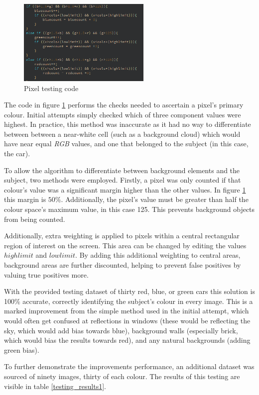 \documentclass[conference]{IEEEtran}
\begin{document}
\begin{figure}[H]
\centering
\includegraphics[width=2.5in]{t1}
\caption{Pixel testing code}
\label{fig_t1code}
\end{figure}

The code in figure \ref{fig_t1code} performs the checks needed to ascertain a pixel's primary colour. Initial attempts simply checked which of three component values were highest. In practice, this method was inaccurate as it had no way to differentiate between  between a near-white cell (such as a background cloud) which would have near equal \textit{RGB} values, and one that belonged to the subject (in this case, the car).

To allow the algorithm to differentiate between background elements and the subject, two methods were employed. Firstly, a pixel was only counted if that colour's value was a significant margin higher than the other values. In figure \ref{fig_t1code} this margin is $50\%$. Additionally, the pixel's value must be greater than half the colour space's maximum value, in this case 125. This prevents background objects from being counted.


Additionally, extra weighting is applied to pixels within a central rectangular region of interest on the screen. This area can be changed by editing the values $highlimit$ and $lowlimit$. By adding this additional weighting to central areas, background areas are further discounted, helping to prevent false positives by valuing true positives more.

With the provided testing dataset of thirty red, blue, or green cars this solution is 100$\%$ accurate, correctly identifying the subject's colour in every image. This is a marked improvement from the simple method used in the initial attempt, which would often get confused at reflections in windows (these would be reflecting the sky, which would add bias towards blue), background walls (especially brick, which would bias the results towards red), and any natural backgrounds (adding green bias).

To further demonstrate the improvements performance, an additional dataset was sourced of ninety images, thirty of each colour. The results of this testing are visible in table \ref{testing_results1}.
\end{document}
